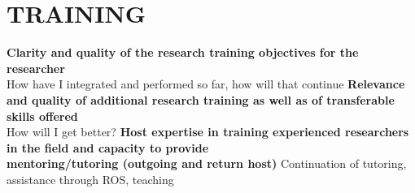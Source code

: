 \section{TRAINING} %
\label{sec:training}
\textbf{Clarity and quality of the research training objectives for the researcher} \\
How have I integrated and performed so far, how will that continue
\textbf{Relevance and quality of additional research training as well as of transferable skills offered} \\
How will I get better?
\textbf{Host expertise in training  experienced researchers in the field and capacity to provide  \\
mentoring/tutoring (outgoing and return host)} 
Continuation of tutoring, assistance through ROS, teaching
\newpage


